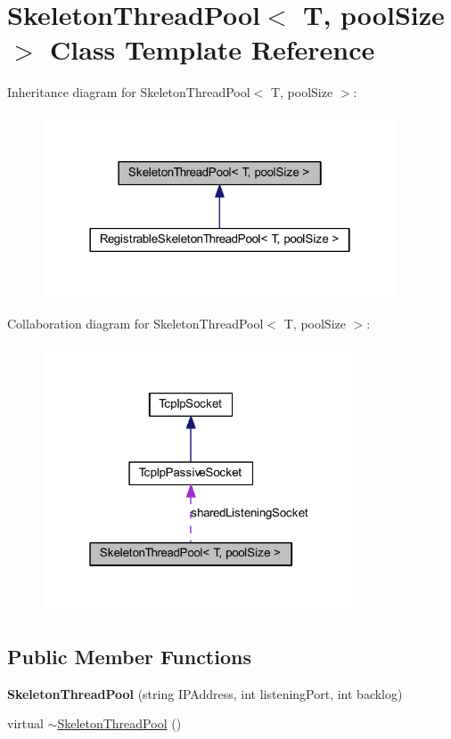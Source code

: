 \hypertarget{class_skeleton_thread_pool}{
\section{SkeletonThreadPool$<$ T, poolSize $>$ Class Template Reference}
\label{class_skeleton_thread_pool}
}


Inheritance diagram for SkeletonThreadPool$<$ T, poolSize $>$:\nopagebreak
\begin{figure}[H]
\begin{center}
\leavevmode
\includegraphics[width=298pt]{class_skeleton_thread_pool__inherit__graph}
\end{center}
\end{figure}


Collaboration diagram for SkeletonThreadPool$<$ T, poolSize $>$:\nopagebreak
\begin{figure}[H]
\begin{center}
\leavevmode
\includegraphics[width=265pt]{class_skeleton_thread_pool__coll__graph}
\end{center}
\end{figure}
\subsection*{Public Member Functions}
\begin{DoxyCompactItemize}
\item 
\hypertarget{class_skeleton_thread_pool_ada7b89da50e6100ff4dd51047d345ca2}{
{\bfseries SkeletonThreadPool} (string IPAddress, int listeningPort, int backlog)}
\label{class_skeleton_thread_pool_ada7b89da50e6100ff4dd51047d345ca2}

\item 
virtual \hyperlink{class_skeleton_thread_pool_abaa75a52e08a43b3d6a5065bc2efc9ef}{$\sim$SkeletonThreadPool} ()
\end{DoxyCompactItemize}
